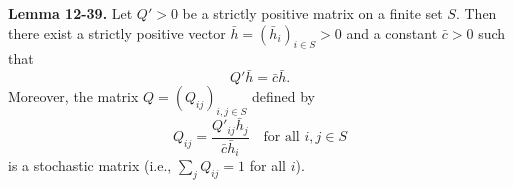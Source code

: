 \textbf{Lemma 12-39.} Let $Q' > 0$ be a strictly positive matrix on a finite set $S$. Then there exist a strictly positive vector $\bar{h} = (\bar{h}_i)_{i \in S} > 0$ and a constant $\bar{c} > 0$ such that
$$
Q' \bar{h} = \bar{c} \bar{h}.
$$
Moreover, the matrix $Q = (Q_{ij})_{i,j \in S}$ defined by
$$
Q_{ij} = \frac{Q'_{ij} \bar{h}_j}{\bar{c} \bar{h}_i} \quad \text{for all } i, j \in S
$$
is a stochastic matrix (i.e., $\sum_j Q_{ij} = 1$ for all $i$).
